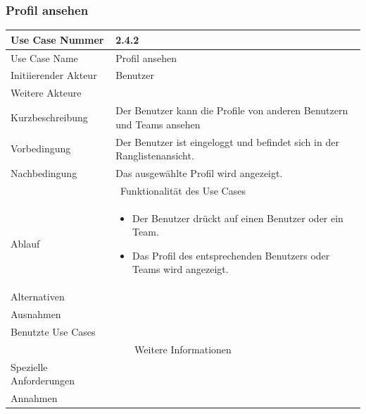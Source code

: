 \documentclass[10pt,a4paper]{article}
\begin{document}
\subsubsection{Profil ansehen}
	\begin{tabularx}{\textwidth}{|l|X|}
	\hline Use Case Nummer & 2.4.2 \\ 
	\hline Use Case Name & Profil ansehen \\ 
	\hline Initiierender Akteur & Benutzer \\
	\hline Weitere Akteure &  \\
	\hline Kurzbeschreibung & Der Benutzer kann die Profile von anderen Benutzern und Teams ansehen \\
	\hline Vorbedingung & Der Benutzer ist eingeloggt und befindet sich in der Ranglistenansicht. \\
	\hline Nachbedingung & Das ausgewählte Profil wird angezeigt. \\
	\hline \multicolumn{2}{|c|}{Funktionalität des Use Cases}\\
	\hline Ablauf & \begin{itemize}
		\item Der Benutzer drückt auf einen Benutzer oder ein Team.
		\item Das Profil des entsprechenden Benutzers oder Teams wird angezeigt.
	\end{itemize} \\
	\hline Alternativen &  \\
	\hline Ausnahmen &  \\
	\hline Benutzte Use Cases &  \\
	\hline \multicolumn{2}{|c|}{Weitere Informationen} \\
	\hline Spezielle Anforderungen &  \\
	\hline Annahmen &  \\
	\hline
	\end{tabularx}
\end{document}
